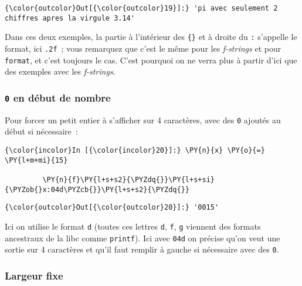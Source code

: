 \begin{Verbatim}[commandchars=\\\{\},frame=single,framerule=0.3mm,rulecolor=\color{cellframecolor}]
{\color{outcolor}Out[{\color{outcolor}19}]:} 'pi avec seulement 2 chiffres apres la virgule 3.14'
\end{Verbatim}
            
    Dans ces deux exemples, la partie à l'intérieur des \texttt{\{\}} et à
droite du \texttt{:} s'appelle le format, ici \texttt{.2f}~; vous
remarquez que c'est le même pour les \emph{f-strings} et pour
\texttt{format}, et c'est toujours le cas. C'est pourquoi on ne verra
plus à partir d'ici que des exemples avec les \emph{f-strings}.

    \hypertarget{en-duxe9but-de-nombre}{%
\subsubsection{\texorpdfstring{\texttt{0} en début de
nombre}{0 en début de nombre}}\label{en-duxe9but-de-nombre}}

    Pour forcer un petit entier à s'afficher sur 4 caractères, avec des
\texttt{0} ajoutés au début si nécessaire~:

    \begin{Verbatim}[commandchars=\\\{\},frame=single,framerule=0.3mm,rulecolor=\color{cellframecolor}]
{\color{incolor}In [{\color{incolor}20}]:} \PY{n}{x} \PY{o}{=} \PY{l+m+mi}{15}
         
         \PY{n}{f}\PY{l+s+s2}{\PYZdq{}}\PY{l+s+si}{\PYZob{}x:04d\PYZcb{}}\PY{l+s+s2}{\PYZdq{}}
\end{Verbatim}


\begin{Verbatim}[commandchars=\\\{\},frame=single,framerule=0.3mm,rulecolor=\color{cellframecolor}]
{\color{outcolor}Out[{\color{outcolor}20}]:} '0015'
\end{Verbatim}
            
    Ici on utilise le format \texttt{d} (toutes ces lettres \texttt{d},
\texttt{f}, \texttt{g} viennent des formats ancestraux de la libc comme
\texttt{printf}). Ici avec \texttt{04d} on précise qu'on veut une sortie
sur 4 caractères et qu'il faut remplir à gauche si nécessaire avec des
\texttt{0}.

    \hypertarget{largeur-fixe}{%
\subsubsection{Largeur fixe}\label{largeur-fixe}}

